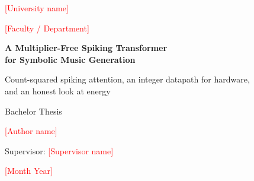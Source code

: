 \documentclass[12pt, a4paper, oneside]{report}
\newcommand{\fillin}[1]{\textcolor{red}{[#1]}}
\begin{document}
\begin{titlepage}
\centering
\vspace*{1.5cm}
{\large \fillin{University name}\par}
{\large \fillin{Faculty / Department}\par}
\vspace{2cm}
{\LARGE\bfseries A Multiplier-Free Spiking Transformer\\[4pt] for Symbolic Music Generation\par}
\vspace{1cm}
{\large Count-squared spiking attention, an integer datapath for hardware,\\ and an honest look at energy\par}
\vspace{2.5cm}
{\large Bachelor Thesis\par}
\vspace{1cm}
{\large \fillin{Author name}\par}
\vspace{0.5cm}
{\large Supervisor: \fillin{Supervisor name}\par}
\vfill
{\large \fillin{Month Year}\par}
\end{titlepage}


\tableofcontents
\listoffigures
\listoftables


\cleardoublepage
{}












\appendix

\end{document}
